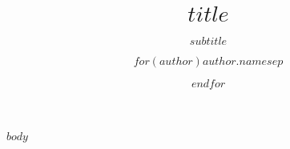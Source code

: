 \documentclass[ignorenonframetext]{beamer}
\title{$title$}
\subtitle{$subtitle$}
\author{$for(author)$$author.name$$sep$ \and $endfor$}
\begin{document}
\frame{\titlepage}

$body$
\end{document}
